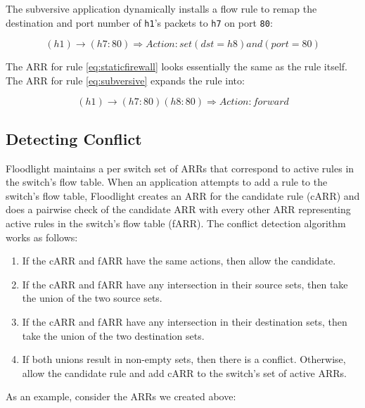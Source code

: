 The subversive application dynamically installs a flow rule to remap the destination and port number of \texttt{h1}'s packets to \texttt{h7} on port \texttt{80}:

\begin{equation}\label{eq:subversive}
(h1) \rightarrow (h7:80) \Rightarrow Action: set (dst = h8) and (port = 80)
\end{equation}

The ARR for rule \ref{eq:staticfirewall} looks essentially the same as the rule itself.
The ARR for rule \ref{eq:subversive} expands the rule into:

\begin{equation}\label{eq:arrsubversive}
(h1) \rightarrow (h7:80) (h8:80) \Rightarrow Action: forward
\end{equation}

\subsection{Detecting Conflict}
\label{subsec:conflict}
Floodlight maintains a per switch set of ARRs that correspond to active rules in the switch's flow table.
When an application attempts to add a rule to the switch's flow table, Floodlight creates an ARR for the candidate rule (cARR) and does a pairwise check of the candidate ARR with every other ARR representing active rules in the switch's flow table (fARR).
The conflict detection algorithm works as follows:
\begin{enumerate}
\item If the cARR and fARR have the same actions, then allow the candidate.
\item If the cARR and fARR have any intersection in their source sets, then take the union of the two source sets.
\item If the cARR and fARR have any intersection in their destination sets, then take the union of the two destination sets.
\item If both unions result in non-empty sets, then there is a conflict. Otherwise, allow the candidate rule and add cARR to the switch's set of active ARRs.
\end{enumerate} 

As an example, consider the ARRs we created above:
 
